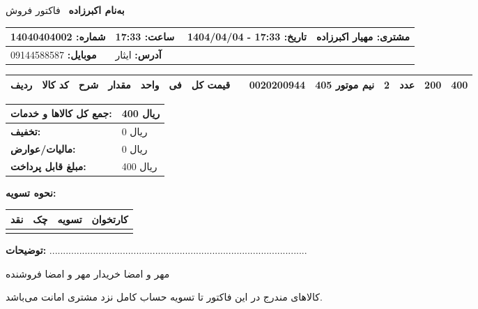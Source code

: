 \documentclass[a4paper,12pt]{article}
\begin{document}
\begin{center}
    {\Huge \textbf{به‌نام اکبرزاده}} \
    {\large فاکتور فروش}
\end{center}

\vspace{0.5cm}

\noindent
\begin{tabular}{|p{7cm}|p{7cm}|}
\hline
\textbf{شماره:} 14040404002 & \textbf{تاریخ:} 17:33 - 1404/04/04 \
\hline
\textbf{ساعت:} 17:33 & \textbf{مشتری:} مهیار اکبرزاده \\
\hline
\textbf{موبایل:} 09144588587 & \textbf{آدرس:} ایثار \\
\hline
\end{tabular}

\vspace{0.5cm}

\begin{longtable}{|c|c|p{4cm}|c|c|c|c|}
\hline
{} \color{white}
\textbf{ردیف} & \textbf{کد کالا} & \textbf{شرح} & \textbf{مقدار} & \textbf{واحد} & \textbf{فی} & \textbf{قیمت کل} \
\hline
\endhead
1 & 0020200944 & نيم موتور 405 & 2 & عدد & 200 & 400 \\
\hline
\end{longtable}

\vspace{0.3cm}
\noindent
\begin{tabular}{|p{7cm}|p{7cm}|}
\hline
\textbf{جمع کل کالاها و خدمات:} & 400 ریال \\
\hline
\textbf{تخفیف:} & 0 ریال \\
\hline
\textbf{مالیات/عوارض:} & 0 ریال \\
\hline
\textbf{مبلغ قابل پرداخت:} & 400 ریال \\
\hline
\end{tabular}

\vspace{0.3cm}

\noindent
\textbf{نحوه تسویه:}
\begin{tabular}{|c|c|c|c|}
\hline
نقد & چک & تسویه & کارتخوان \\
\hline
 &  &  &  \\
\hline
\end{tabular}

\vspace{0.5cm}

\noindent
\textbf{توضیحات:} ...............................................................................................

\vspace{1.5cm}

\noindent
مهر و امضا خریدار \hspace{8cm} مهر و امضا فروشنده

\vfill

\noindent
کالاهای مندرج در این فاکتور تا تسویه حساب کامل نزد مشتری امانت می‌باشد.
\end{document}
